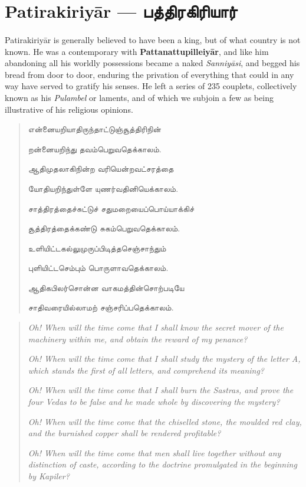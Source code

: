 \documentclass{article}
\newcommand{\TamilText}[1]{\texttamil{#1}}
\newcommand{\TamilBold}[1]{\texttamil{\textbf{#1}}}
\newcommand{\tam}[1]{\TamilText{#1}}
\newcommand{\tambold}[1]{\TamilBold{#1}}
\begin{document}
\section{Patirakiriy\={a}r --- \tambold{பத்திரகிரியார்}}
\paragraph{}
Patirakiriy\={a}r is generally believed to have been a king, but of what country is not known. He was a contemporary with \textbf{Pattanattupilleiy\={a}r}, and like him abandoning all his worldly possessions became a naked \emph{Sanniy\={a}si}, and begged his bread from door to door, enduring the privation of everything that could in any way have served to gratify his senses. He left a series of 235 couplets, collectively known as his \emph{Pulambel} or laments, and of which we subjoin a few as being illustrative of his religious opinions.
\begin{quotation}\small
\tam{என்னையறியாதிருந்தாட்டுஞ்சூத்திரிநின்‌}

\tam{றன்னையறிந்து தவம்பெறுவதெக்காலம்‌}.

\bigskip

\tam{ஆதிமுதலாகிநின்ற வரியென்றவட்சரத்தை}

\tam{யோதியறிந்துள்ளே யுணர்வதினியெக்காலம்‌}.

\bigskip

\tam{சாத்திரத்தைச்சுட்டுச்‌ சதுமறையைப்பொய்யாக்கிச்‌}

\tam{சூத்திரத்தைக்கண்டு சுகம்பெறுவதெக்காலம்‌}.

\bigskip

\tam{உளியிட்டகல்லுமுருப்பிடித்தசெஞ்சாந்தும்‌}

\tam{புளியிட்டசெம்பும்‌ பொருளாவதெக்காலம்‌}.

\bigskip

\tam{ஆதிகபிலர்சொன்ன வாகமத்தின்சொற்படியே}

\tam{சாதிவரையில்லாமற்‌ சஞ்சரிப்பதெக்காலம்‌}.
\end{quotation}
\begin{quotation}\small
\emph{Oh! When will the time come that I shall know the secret mover of the machinery within me, and obtain the reward of my penance?}

\emph{Oh! When will the time come that I shall study the mystery of the letter A, which stands the first of all letters, and comprehend its meaning?}

\emph{Oh! When will the time come that I shall burn the Sastras, and prove the four Vedas to be false and he made whole by discovering the mystery?}

\emph{Oh! When will the time come that the chiselled stone, the moulded red clay, and the burnished copper shall be rendered profitable?}

\emph{Oh! When will the time come that men shall live together without any distinction of caste, according to the doctrine promulgated in the beginning by Kapiler?}
\end{quotation}
\end{document}
